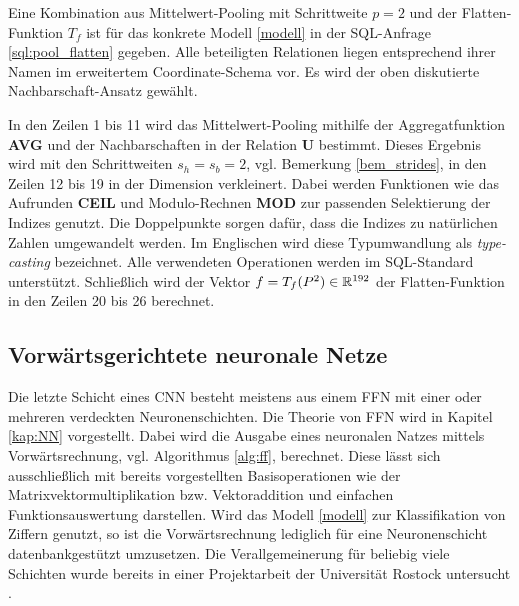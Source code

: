 Eine Kombination aus Mittelwert-Pooling mit Schrittweite $p=2$ und der Flatten-Funktion $T_f$ ist für das konkrete Modell \ref{modell} in der SQL-Anfrage \ref{sql:pool_flatten} gegeben. Alle beteiligten Relationen liegen entsprechend ihrer Namen im erweitertem Coordinate-Schema vor. Es wird der oben diskutierte Nachbarschaft-Ansatz gewählt.



In den Zeilen 1 bis 11 wird das Mittelwert-Pooling mithilfe der Aggregatfunktion \textbf{AVG} und der Nachbarschaften in der Relation \textbf{U} bestimmt. Dieses Ergebnis wird mit den Schrittweiten $s_h=s_b=2$, vgl. Bemerkung \ref{bem_strides}, in den Zeilen 12 bis 19 in der Dimension verkleinert. Dabei werden Funktionen wie das Aufrunden \textbf{CEIL} und Modulo-Rechnen \textbf{MOD} zur passenden Selektierung der Indizes genutzt. Die Doppelpunkte sorgen dafür, dass die Indizes zu natürlichen Zahlen umgewandelt werden. Im Englischen wird diese Typumwandlung als \textit{type-casting} bezeichnet. Alle verwendeten Operationen werden im SQL-Standard unterstützt. Schließlich wird der Vektor $f=T_f(P^2) \in \mathbb{R}^{192}$ der Flatten-Funktion in den Zeilen 20 bis 26 berechnet. 
 
\subsection*{Vorwärtsgerichtete neuronale Netze}
Die letzte Schicht eines CNN besteht meistens aus einem FFN mit einer oder mehreren verdeckten Neuronenschichten. Die Theorie von FFN wird in Kapitel \ref{kap:NN} vorgestellt. Dabei wird die Ausgabe eines neuronalen Natzes mittels Vorwärtsrechnung, vgl. Algorithmus \ref{alg:ff}, berechnet. Diese lässt sich ausschließlich mit bereits vorgestellten Basisoperationen wie der Matrixvektormultiplikation bzw. Vektoraddition und einfachen Funktionsauswertung darstellen. Wird das Modell \ref{modell} zur Klassifikation von Ziffern genutzt, so ist die Vorwärtsrechnung lediglich für eine Neuronenschicht datenbankgestützt umzusetzen. Die Verallgemeinerung für beliebig viele Schichten wurde bereits in einer Projektarbeit der Universität Rostock untersucht \cite{myprojekt}. 

